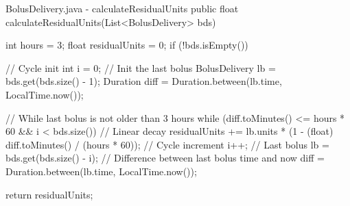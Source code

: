 \begin{javaCode}{BolusDelivery.java - calculateResidualUnits}
public float calculateResidualUnits(List<BolusDelivery> bds) {
    int hours = 3;
    float residualUnits = 0;
    if (!bds.isEmpty()) {
        // Cycle init
        int i = 0;
        // Init the last bolus
        BolusDelivery lb = bds.get(bds.size() - 1);
        Duration diff = Duration.between(lb.time, LocalTime.now());

        // While last bolus is not older than 3 hours
        while (diff.toMinutes() <= hours * 60 && i < bds.size()) {
            // Linear decay
            residualUnits += lb.units * (1 - (float) diff.toMinutes() / (hours * 60));
            // Cycle increment
            i++;
            // Last bolus
            lb = bds.get(bds.size() - i);
            // Difference between last bolus time and now
            diff = Duration.between(lb.time, LocalTime.now());
        }
    }
    return residualUnits;
}
\end{javaCode}